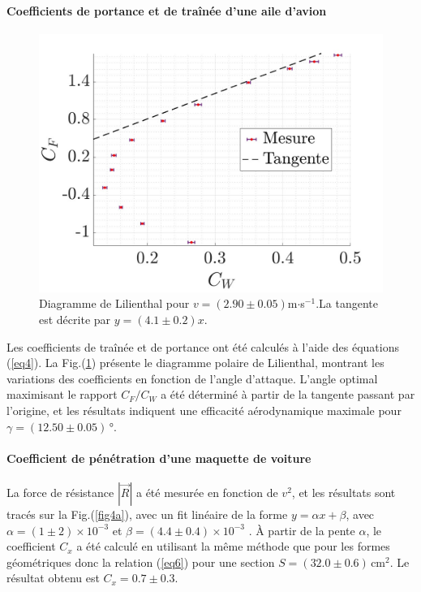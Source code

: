 \documentclass[a4paper, 12pt,oneside]{article}
\begin{document}
\paragraph{Coefficients de portance et de traînée d’une aile d’avion}  

\begin{figure}
    \centering
    \includegraphics[width=1\linewidth]{Graphes/fig3.jpg}
    \captionsetup{justification=centering}
    \caption{Diagramme de Lilienthal pour $v=(2.90\pm0.05)$m$\cdot$s$^{-1}$.La tangente est décrite par \( y = (4.1 \pm 0.2)x \).}
    \label{fig3}
\end{figure}

Les coefficients de traînée et de portance ont été calculés à l'aide des équations (\ref{eq4}). La Fig.(\ref{fig3}) présente le diagramme polaire de Lilienthal, montrant les variations des coefficients en fonction de l’angle d’attaque. L’angle optimal maximisant le rapport $C_F/C_W$ a été déterminé à partir de la tangente passant par l’origine, et les résultats indiquent une efficacité aérodynamique maximale pour $\gamma = (12.50 \pm 0.05)$\,°.

\vspace{0.5cm}

\paragraph{Coefficient de pénétration d’une maquette de voiture}  
La force de résistance $|\vec{R}|$ a été mesurée en fonction de $v^2$, et les résultats sont tracés sur la Fig.(\ref{fig4a}), avec un fit linéaire de la forme $y= \alpha x + \beta $, avec $\alpha =(1\pm2)\times 10^{-3}$ et $\beta =(4.4\pm0.4)\times 10^{-3}$ . À partir de la pente $\alpha$, le coefficient $C_x$ a été calculé en utilisant la même méthode que pour les formes géométriques donc la relation (\ref{eq6}) pour une section $S=(32.0\pm0.6)$\,cm$^2$. Le résultat obtenu est $C_x = 0.7\pm0.3$. 
\end{document}

